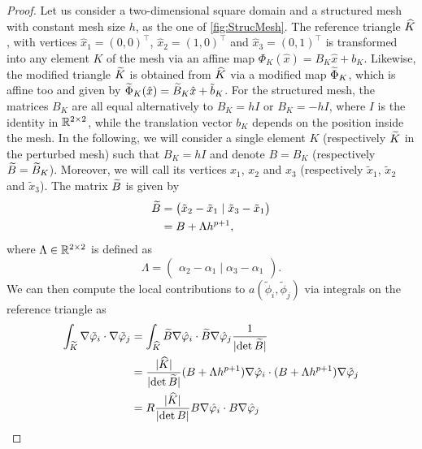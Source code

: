 \documentclass[10pt]{article}
\begin{document}
\begin{proof}
	Let us consider a two-dimensional square domain and a structured mesh with constant mesh size $h$, as the one of \cref{fig:StrucMesh}. The reference triangle $\widehat K$, with vertices $\hat x_1 = (0, 0)^\top$, $\hat x_2 = (1, 0)^\top$ and $\hat x_3 = (0, 1)^\top$ is transformed into any element $K$ of the mesh via an affine map $\Phi_K(\hat x) = B_K \hat x + b_K$. Likewise, the modified triangle $\widetilde K$ is obtained from $\widehat K$ via a modified map $\widetilde \Phi_K$, which is affine too and given by $\widetilde \Phi_K(\hat x) = \widetilde B_K \hat x + \tilde b_K$. For the structured mesh, the matrices $B_K$ are all equal alternatively to $B_K = hI$ or $B_K = -hI$, where $I$ is the identity in $\mathbb{R}^{2\times 2}$, while the translation vector $b_K$ depends on the position inside the mesh. In the following, we will consider a single element $K$ (respectively $\widetilde K$ in the perturbed mesh) such that $B_K = hI$ and denote $B = B_K$ (respectively $\widetilde B = \widetilde B_K$). Moreover, we will call its vertices $x_1$, $x_2$ and $x_3$ (respectively $\tilde x_1$, $\tilde x_2$ and $\tilde x_3$). The matrix $\widetilde B$ is given by
	\begin{equation}
	\begin{aligned}
		\widetilde B &= \begin{pmatrix}\tilde x_2 - \tilde x_1 \mid \tilde x_3 - \tilde x_1\end{pmatrix} \\
		&= B + \Lambda h^{p+1},
	\end{aligned}
	\end{equation}
	where $\Lambda \in \mathbb{R}^{2\times 2}$ is defined as
	\begin{equation}
		\Lambda = \begin{pmatrix}\alpha_2 - \alpha_1 \mid \alpha_3 - \alpha_1\end{pmatrix}.
	\end{equation}
	We can then compute the local contributions to $a(\tilde \phi_i, \tilde \phi_j)$ via integrals on the reference triangle as
	\begin{equation}
	\begin{aligned}
		\int_{\btilde K} \nabla \tilde \phi_i \cdot \nabla \tilde \phi_j &= \int_{\bhat K} \btilde B \nabla \hat \phi_i \cdot \btilde B \nabla \hat \phi_j \frac{1}{\abs{\det\btilde B}} \\
		&= \frac{\abs{\bhat K}}{\abs{\det\btilde B}}(B + \Lambda h^{p+1})\nabla \hat \phi_i \cdot (B + \Lambda h^{p+1}) \nabla \hat \phi_j \\
		&=  R \frac{\abs{\bhat K}}{\abs{\det B}} B \nabla \hat \phi_i \cdot B \nabla \hat \phi_j \\

\end{aligned}
\end{equation}
\end{proof}
\end{document}
